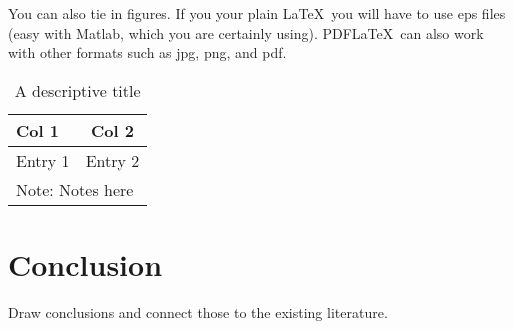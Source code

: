 \documentclass[11pt,a4paper]{article}
\begin{document}
You can also tie in figures. If you your plain \LaTeX\ you will have to use eps files (easy with Matlab, which you are certainly using). 
PDF\LaTeX\ can also work with other formats such as jpg, png, and pdf.



\begin{table}[t]
\begin{center}
\caption{A descriptive title}
\label{tab:a_great_table}
\begin{tabular}{lc}
\hline\hline
Col 1 & Col 2\\
\hline
Entry 1 & Entry 2\\
\hline\hline
\multicolumn{2}{l}{\footnotesize{Note: Notes here}}
\end{tabular}
\end{center}
\end{table}

\section{Conclusion}
Draw conclusions and connect those to the existing literature.





\end{document}
